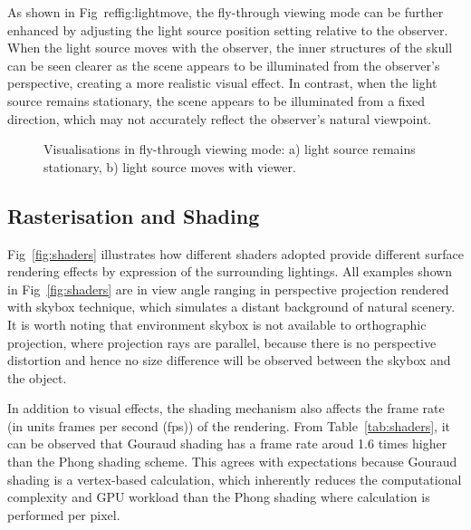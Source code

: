 \documentclass[11pt, twocolumn]{article}
\begin{document}
As shown in Fig~ref{fig:lightmove}, the fly-through viewing mode can be further enhanced by adjusting the light source position setting relative to the observer. When the light source moves with the observer, the inner structures of the skull can be seen clearer as the scene appears to be illuminated from the observer's perspective, creating a more realistic visual effect. In contrast, when the light source remains stationary, the scene appears to be illuminated from a fixed direction, which may not accurately reflect the observer's natural viewpoint.
\begin{figure}[ht]
    \centering
    \caption{Visualisations in fly-through viewing mode: a) light source remains stationary, b) light source moves with viewer.}
    \label{fig:lightmove}
\end{figure}
\vspace{-1em}
\subsection{Rasterisation and Shading}
Fig~\ref{fig:shaders} illustrates how different shaders adopted provide different surface rendering effects by expression of the surrounding lightings. All examples shown in Fig~\ref{fig:shaders} are in view angle ranging in perspective projection rendered with skybox technique, which simulates a distant background of natural scenery. It is worth noting that environment skybox is not available to orthographic projection, where projection rays are parallel, because there is no perspective distortion and hence no size difference will be observed between the skybox and the object.

In addition to visual effects, the shading mechanism also affects the frame rate (in units frames per second (fps)) of the rendering.
From Table~\ref{tab:shaders}, it can be observed that Gouraud shading has a frame rate aroud 1.6 times higher than the Phong shading scheme. This agrees with expectations because Gouraud shading is a vertex-based calculation, which inherently reduces the computational complexity and GPU workload than the Phong shading where calculation is performed per pixel. 
\end{document}

